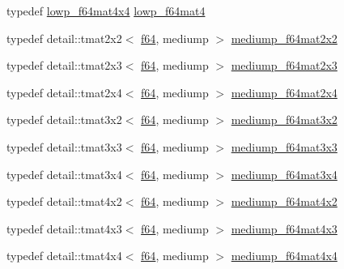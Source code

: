 \begin{CompactItemize}
\item 
typedef \hyperlink{group__gtc__type__precision_gb7d0922ed8d93ee3ce995858feb41231}{lowp\_\-f64mat4x4} \hyperlink{group__gtc__type__precision_g4378d9384f1b24848043ccb02dcf2959}{lowp\_\-f64mat4}
\item 
typedef detail::tmat2x2$<$ \hyperlink{group__gtc__type__precision_g2bba392e555124b36cde6abba349bab3}{f64}, mediump $>$ \hyperlink{group__gtc__type__precision_gcfa9f872c78d9e8b8e6c5dd0088db8fc}{mediump\_\-f64mat2x2}
\item 
typedef detail::tmat2x3$<$ \hyperlink{group__gtc__type__precision_g2bba392e555124b36cde6abba349bab3}{f64}, mediump $>$ \hyperlink{group__gtc__type__precision_g6f463cb5e9b4e5c07a385843ed50e6b8}{mediump\_\-f64mat2x3}
\item 
typedef detail::tmat2x4$<$ \hyperlink{group__gtc__type__precision_g2bba392e555124b36cde6abba349bab3}{f64}, mediump $>$ \hyperlink{group__gtc__type__precision_g65c67789f7e2ff605d8f48dc3750a515}{mediump\_\-f64mat2x4}
\item 
typedef detail::tmat3x2$<$ \hyperlink{group__gtc__type__precision_g2bba392e555124b36cde6abba349bab3}{f64}, mediump $>$ \hyperlink{group__gtc__type__precision_gd6408472435fce994a3bb9d14d321ddd}{mediump\_\-f64mat3x2}
\item 
typedef detail::tmat3x3$<$ \hyperlink{group__gtc__type__precision_g2bba392e555124b36cde6abba349bab3}{f64}, mediump $>$ \hyperlink{group__gtc__type__precision_g871b69a221dae7461aa746e6e6d372fc}{mediump\_\-f64mat3x3}
\item 
typedef detail::tmat3x4$<$ \hyperlink{group__gtc__type__precision_g2bba392e555124b36cde6abba349bab3}{f64}, mediump $>$ \hyperlink{group__gtc__type__precision_gc3b0ca6d79631a2480cee8897dcd79ec}{mediump\_\-f64mat3x4}
\item 
typedef detail::tmat4x2$<$ \hyperlink{group__gtc__type__precision_g2bba392e555124b36cde6abba349bab3}{f64}, mediump $>$ \hyperlink{group__gtc__type__precision_g4a7a2b6889f08c9209a4f994fd87cc4e}{mediump\_\-f64mat4x2}
\item 
typedef detail::tmat4x3$<$ \hyperlink{group__gtc__type__precision_g2bba392e555124b36cde6abba349bab3}{f64}, mediump $>$ \hyperlink{group__gtc__type__precision_g4a920abfb082b0ffd8d89614cb787021}{mediump\_\-f64mat4x3}
\item 
typedef detail::tmat4x4$<$ \hyperlink{group__gtc__type__precision_g2bba392e555124b36cde6abba349bab3}{f64}, mediump $>$ \hyperlink{group__gtc__type__precision_g941e42a0b337b5c8ad9c324aaa6b2ad5}{mediump\_\-f64mat4x4}
\item 

\end{CompactItemize}
